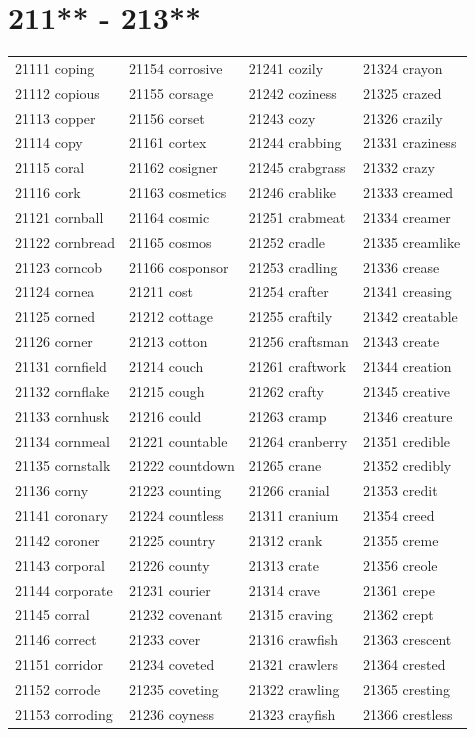 \documentclass[10pt, oneside]{book}
\begin{document}
\begin{table}
	\centering
	\section*{211** - 213**}
	\begin{tabular}{l l l l}
21111 coping &21154 corrosive &21241 cozily &21324 crayon\\
21112 copious &21155 corsage &21242 coziness &21325 crazed\\
21113 copper &21156 corset &21243 cozy &21326 crazily\\
21114 copy &21161 cortex &21244 crabbing &21331 craziness\\
21115 coral &21162 cosigner &21245 crabgrass &21332 crazy\\
21116 cork &21163 cosmetics &21246 crablike &21333 creamed\\
21121 cornball &21164 cosmic &21251 crabmeat &21334 creamer\\
21122 cornbread &21165 cosmos &21252 cradle &21335 creamlike\\
21123 corncob &21166 cosponsor &21253 cradling &21336 crease\\
21124 cornea &21211 cost &21254 crafter &21341 creasing\\
21125 corned &21212 cottage &21255 craftily &21342 creatable\\
21126 corner &21213 cotton &21256 craftsman &21343 create\\
21131 cornfield &21214 couch &21261 craftwork &21344 creation\\
21132 cornflake &21215 cough &21262 crafty &21345 creative\\
21133 cornhusk &21216 could &21263 cramp &21346 creature\\
21134 cornmeal &21221 countable &21264 cranberry &21351 credible\\
21135 cornstalk &21222 countdown &21265 crane &21352 credibly\\
21136 corny &21223 counting &21266 cranial &21353 credit\\
21141 coronary &21224 countless &21311 cranium &21354 creed\\
21142 coroner &21225 country &21312 crank &21355 creme\\
21143 corporal &21226 county &21313 crate &21356 creole\\
21144 corporate &21231 courier &21314 crave &21361 crepe\\
21145 corral &21232 covenant &21315 craving &21362 crept\\
21146 correct &21233 cover &21316 crawfish &21363 crescent\\
21151 corridor &21234 coveted &21321 crawlers &21364 crested\\
21152 corrode &21235 coveting &21322 crawling &21365 cresting\\
21153 corroding &21236 coyness &21323 crayfish &21366 crestless\\
	\end{tabular}
 \end{table}
\clearpage
\end{document}
